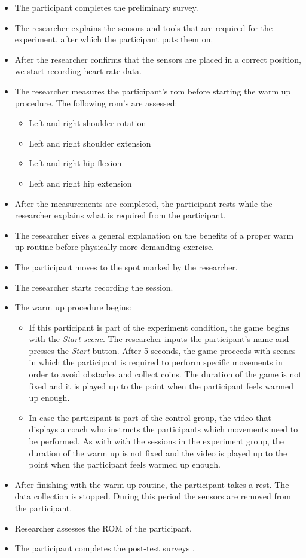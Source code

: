\begin{itemize}
\item The participant completes the preliminary survey.
\item The researcher explains the sensors and tools that are required for the experiment, after which the participant puts them on. 
\item After the researcher confirms that the sensors are placed in a correct position, we start recording heart rate data.
\item The researcher measures the participant's \acrshort{rom} before starting the warm up procedure. The following \acrshort{rom}'s are assessed: 
\begin{itemize}
\item Left and right shoulder rotation
\item Left and right shoulder extension
\item Left and right hip flexion
\item Left and right hip extension
\end{itemize}
\item After the measurements are completed, the participant rests while the researcher explains what is required from the participant.
\item The researcher gives a general explanation on the benefits of a proper warm up routine before physically more demanding exercise.
\item The participant moves to the spot marked by the researcher.
\item The researcher starts recording the session. \\
\item The warm up procedure begins:
\begin{itemize}
\item If this participant is part of the experiment condition, the game begins with the \textit{Start scene}. The researcher inputs the participant's name and presses the \textit{Start} button. After 5 seconds, the game proceeds with scenes in which the participant is required to perform specific movements in order to avoid obstacles and collect coins. The duration of the game is not fixed and it is played up to the point when the participant feels warmed up enough. 
\item  In case the participant is part of the control group, the video that displays a coach who instructs the participants which movements need to be performed. As with with the sessions in the experiment group, the duration of the warm up is not fixed and the video is played up to the point when the participant feels warmed up enough.
\end{itemize}
\item After finishing with the warm up routine, the participant takes a rest. The data collection is stopped. During this period the sensors are removed from the participant. \item Researcher assesses the ROM of the participant. 
\item The participant completes the post-test surveys . %
\end{itemize}
